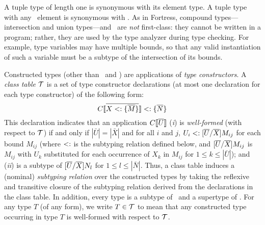 
A tuple type of length one is synonymous with its element type. 
A tuple type with any \BottomType\ element 
is synonymous with \BottomType.
As in Fortress, 
compound types---intersection and union types---and \BottomType\ 
are \emph{not} first-class:
they cannot be written in a program; 
rather, they are used by the type analyzer during type checking.
For example, type variables may have multiple bounds, 
so that any valid instantiation of such a variable
must be a subtype of the intersection of its bounds.



Constructed types (other than \Any\ and \BottomType)
are applications of \emph{type constructors}.
A \emph{class table} $\mathcal{T}$
is a set of type constructor declarations 
(at most one declaration for each type constructor) 
of the following form:
\[
C\llbracket {\ensuremath{\overline{{X} <: \{\overline{M}\}}}} \rrbracket <: \{\overline{N}\}
\]
This declaration indicates that an application $C\llbracket \overline{U} \rrbracket$ 
(\emph{i}) is \emph{well-formed} (with respect to $\mathcal{T}$)
if and only if $|\bar{U}| = |\bar{X}|$ and
for all $i$ and $j$, 
$U_i <: [\overline{U}/\overline{X}]M_{ij}$ for each bound $M_{ij}$
(where $<:$ is the subtyping relation defined below, 
and $[\overline{U}/\overline{X}]M_{ij}$ is $M_{ij}$ 
with $U_k$ substituted for each occurrence of $X_k$ in $M_{ij}$ 
for $1 \leq k \leq |\bar{U}|$);
and 
(\emph{ii}) is a subtype of $[\overline{U}/\overline{X}]N_l$ for $1 \leq l \leq |\bar{N}|$.
Thus, a class table induces 
a (nominal) \emph{subtyping relation} over the constructed types 
by taking the reflexive and transitive closure 
of the subtyping relation derived from the declarations in the class table.
In addition, 
every type is a subtype of \Any\ and a supertype of \BottomType.
For any type $T$ (of any form),
we write $T \in \mathcal{T}$ to mean that 
any constructed type occurring in type $T$
is well-formed with respect to $\mathcal{T}$.

